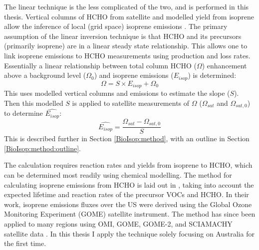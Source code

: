       The linear technique is the less complicated of the two, and is performed in this thesis.
      Vertical columns of HCHO from satellite and modelled yield from isoprene allow the inference of local (grid space) isoprene emissions \parencite{Palmer2003, Millet2006,Marais2012,Bauwens2016}.
      The primary assumption of the linear inversion technique is that HCHO and its precursors (primarily isoprene) are in a linear steady state relationship.
      This allows one to link isoprene emissions to HCHO measurements using production and loss rates.
      Essentially a linear relationship between total column HCHO ($\Omega$) enhancement above a background level ($\Omega_0$) and isoprene emissions ($E_{isop}$) is determined:
      \begin{equation*}
        \Omega = S \times E_{isop} + \Omega_0
      \end{equation*}
      This uses modelled vertical columns and emissions to estimate the slope ($S$).
      Then this modelled $S$ is applied to satellite measurements of $\Omega$ ($\Omega_{sat}$ and $\Omega_{sat,0}$) to determine $\hat{E_{isop}}$:
      \begin{equation*}
        \hat{E_{isop}} = \frac{\Omega_{sat} - \Omega_{sat,0}}{S}
      \end{equation*}
      This is described further in Section \ref{BioIsop:method}, with an outline in Section \ref{BioIsop:method:outline}.
      
      The calculation requires reaction rates and yields from isoprene to HCHO, which can be determined most readily using chemical modelling.
      The method for calculating isoprene emissions from HCHO is laid out in \textcite{Palmer2003}, taking into account the expected lifetime and reaction rates of the precursor VOCs and HCHO.
      In their work, isoprene emissions fluxes over the US were derived using the Global Ozone Monitoring Experiment (GOME) satellite instrument.
      The method has since been applied to many regions using OMI, GOME, GOME-2, and SCIAMACHY satellite data \parencite[e.g.,][]{Abbot2003, Barkley2013, Stavrakou2014, Surl2018}.
      In this thesis I apply the technique solely focusing on Australia for the first time.
      
